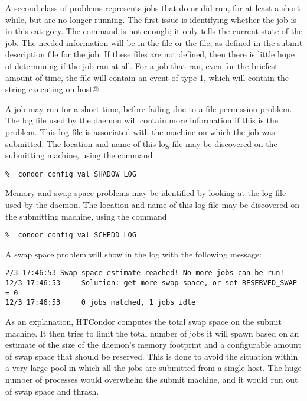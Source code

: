 A second class of problems represents jobs that do or did run,
for at least a short while, but are no longer running.
The first issue is identifying whether the job is in this category.
The  command is not enough; it only tells the
current state of the job.
The needed information will be in the  file 
or the  file, as defined in the submit description file
for the job.
If these files are not defined, then there is little hope of
determining if the job ran at all.
For a job that ran, even for the briefest amount of time,
the  file will contain an event of type 1,
which will contain the string
\verb@Job executing on host@.

A job may run for a short time, before failing due to a file permission
problem.
The log file used by the  daemon will contain more information
if this is the problem.
This log file is associated with the machine on which the job was submitted.
The location and name of this log file may be discovered on the
submitting machine, using the command
\footnotesize
\begin{verbatim}
%  condor_config_val SHADOW_LOG
\end{verbatim}
\normalsize

Memory and swap space problems may be identified by looking at the log
file used by the  daemon.
The location and name of this log file may be discovered on the
submitting machine, using the command
\footnotesize
\begin{verbatim}
%  condor_config_val SCHEDD_LOG
\end{verbatim}
\normalsize
A swap space problem will show in the log with the following message:
\footnotesize
\begin{verbatim}
2/3 17:46:53 Swap space estimate reached! No more jobs can be run!
12/3 17:46:53     Solution: get more swap space, or set RESERVED_SWAP = 0
12/3 17:46:53     0 jobs matched, 1 jobs idle
\end{verbatim}
\normalsize
As an explanation,
HTCondor computes the total swap space on the submit machine.
It then tries to limit the total number of jobs it
will spawn based on an estimate of the size of the 
daemon's memory footprint and a configurable amount of swap space
that should be reserved.
This is done to avoid the
situation within a very large pool
in which all the jobs are submitted from a single host.
The huge number of  processes would
overwhelm the submit machine,
and it would run out of swap space and thrash.

